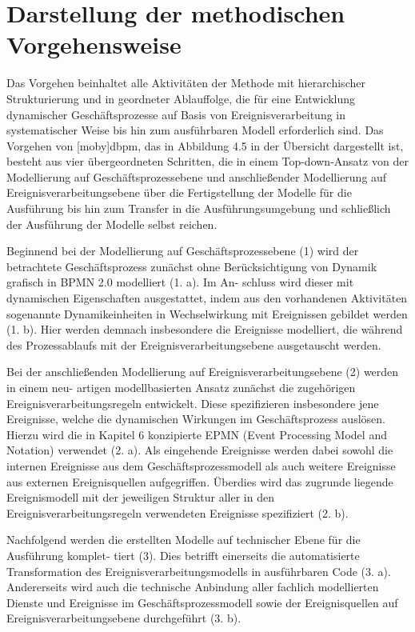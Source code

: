 \section{Darstellung der methodischen Vorgehensweise}\label{sec:methode}
Das Vorgehen beinhaltet alle Aktivitäten der Methode mit hierarchischer Strukturierung und in geordneter Ablauffolge, die für eine Entwicklung dynamischer Geschäftsprozesse auf Basis von Ereignisverarbeitung in systematischer Weise bis hin zum ausführbaren Modell erforderlich sind. Das Vorgehen von [moby]dbpm, das in Abbildung 4.5 in der Übersicht dargestellt ist, besteht aus vier übergeordneten Schritten, die in einem Top-down-Ansatz von der Modellierung auf Geschäftsprozessebene und anschließender Modellierung auf Ereignisverarbeitungsebene über die Fertigstellung der Modelle für die Ausführung bis hin zum Transfer in die Ausführungsumgebung und schließlich der Ausführung der Modelle selbst reichen.



Beginnend bei der Modellierung auf Geschäftsprozessebene (1) wird der betrachtete Geschäftsprozess zunächst ohne Berücksichtigung von Dynamik grafisch in BPMN 2.0 modelliert (1. a). Im An- schluss wird dieser mit dynamischen Eigenschaften ausgestattet, indem aus den vorhandenen Aktivitäten sogenannte Dynamikeinheiten in Wechselwirkung mit Ereignissen gebildet werden (1. b). Hier werden demnach insbesondere die Ereignisse modelliert, die während des Prozessablaufs mit der Ereignisverarbeitungsebene ausgetauscht werden.

Bei der anschließenden Modellierung auf Ereignisverarbeitungsebene (2) werden in einem neu- artigen modellbasierten Ansatz zunächst die zugehörigen Ereignisverarbeitungsregeln entwickelt. Diese spezifizieren insbesondere jene Ereignisse, welche die dynamischen Wirkungen im Geschäftsprozess auslösen. Hierzu wird die in Kapitel 6 konzipierte EPMN (Event Processing Model and Notation) verwendet (2. a). Als eingehende Ereignisse werden dabei sowohl die internen Ereignisse aus dem Geschäftsprozessmodell als auch weitere Ereignisse aus externen Ereignisquellen aufgegriffen. Überdies wird das zugrunde liegende Ereignismodell mit der jeweiligen Struktur aller in den Ereignisverarbeitungsregeln verwendeten Ereignisse spezifiziert (2. b).

Nachfolgend werden die erstellten Modelle auf technischer Ebene für die Ausführung komplet- tiert (3). Dies betrifft einerseits die automatisierte Transformation des Ereignisverarbeitungsmodells in ausführbaren Code (3. a). Andererseits wird auch die technische Anbindung aller fachlich modellierten Dienste und Ereignisse im Geschäftsprozessmodell sowie der Ereignisquellen auf Ereignisverarbeitungsebene durchgeführt (3. b).

